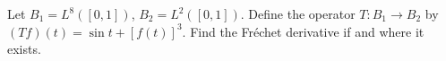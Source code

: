 Let $B_1=L^8([0,1])$, $B_2=L^2([0,1])$. Define the operator
$T:B_1\rightarrow B_2$ by $(Tf)(t)=\sin t+[f(t)]^3$. Find the
Fr\'echet derivative if and where it exists.
